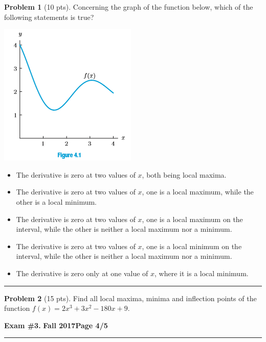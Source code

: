 \documentclass[12pt]{article}
\makeatletter
\theoremstyle{definition}
\newtheorem{problem}{Problem}
\newcommand*{\radiobutton}{%
  \@ifstar{\@radiobutton0}{\@radiobutton1}%
}
\newcommand*{\@radiobutton}[1]{%
  \begin{tikzpicture}
    \pgfmathsetlengthmacro\radius{height("X")/2}
    \draw[radius=\radius] circle;
    \ifcase#1 \fill[radius=.6*\radius] circle;\fi
  \end{tikzpicture}%
}
\makeatother
\begin{document}
\bigskip
\begin{problem}[10 pts]
Concerning the graph of the function below, which of the following statements is true?
\begin{center}
\includegraphics{3graph3}
\end{center}
\begin{itemize}
\item[\radiobutton] The derivative is zero at two values of $x$, both being local maxima.
\item[\radiobutton] The derivative is zero at two values of $x$, one is a local maximum, while the other is a local minimum.
\item[\radiobutton] The derivative is zero at two values of $x$, one is a local maximum on the interval, while the other is neither a local maximum nor a minimum.
\item[\radiobutton] The derivative is zero at two values of $x$, one is a local minimum on the interval, while the other is neither a local maximum nor a minimum.
\item[\radiobutton] The derivative is zero only at one value of $x$, where it is a local minimum.
\end{itemize}
\end{problem}

\hrule
\begin{problem}[15 pts]
Find all local maxima, minima and inflection points of the function $f(x) = 2x^3 + 3x^2-180x+9$.
\end{problem}

\newpage

\hfill{\large\bf Exam \#3.}\hfill{\large\bf
  Fall 2017}\hfill{\large\bf Page 4/5}\hrule

\bigskip
\end{document}
